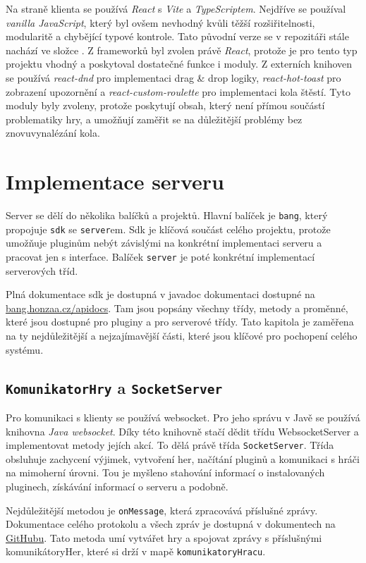 Na straně klienta se používá \emph{React} s \emph{Vite} a \emph{TypeScriptem}. Nejdříve se používal \emph{vanilla JavaScript}, který byl ovšem nevhodný kvůli těžší rozšiřitelnosti, modularitě a chybějící typové kontrole. Tato původní verze se v repozitáři stále nachází ve složce . Z frameworků byl zvolen právě \emph{React}, protože je pro tento typ projektu vhodný a poskytoval dostatečné funkce i moduly. Z externích knihoven se používá \emph{react-dnd} pro implementaci drag \& drop logiky, \emph{react-hot-toast} pro zobrazení upozornění a \emph{react-custom-roulette} pro implementaci kola štěstí. Tyto moduly byly zvoleny, protože poskytují obsah, který není přímou součástí problematiky hry, a umožňují zaměřit se na důležitější problémy bez znovuvynalézání kola.


\section{Implementace serveru}
Server se dělí do několika balíčků a projektů. Hlavní balíček je \texttt{bang}, který propojuje \texttt{sdk} se \texttt{server}em. Sdk je klíčová součást celého projektu, protože umožňuje pluginům nebýt závislými na konkrétní implementaci serveru a pracovat jen s interface. Balíček \texttt{server} je poté konkrétní implementací serverových tříd.

Plná dokumentace sdk je dostupná v javadoc dokumentaci dostupné na \href{https://bang.honzaa.cz/apidocs/}{\url{bang.honzaa.cz/apidocs}}. Tam jsou popsány všechny třídy, metody a proměnné, které jsou dostupné pro pluginy a pro serverové třídy. Tato kapitola je zaměřena na ty nejdůležitější a nejzajímavější části, které jsou klíčové pro pochopení celého systému.



\subsection{\texttt{KomunikatorHry} a \texttt{SocketServer}}
Pro komunikaci s klienty se používá websocket. Pro jeho správu v Javě se používá knihovna \emph{Java websocket}. Díky této knihovně stačí dědit třídu WebsocketServer a implementovat metody jejích akcí. To dělá právě třída \texttt{SocketServer}. Třída obsluhuje zachycení výjimek, vytvoření her, načítání pluginů a komunikaci s hráči na mimoherní úrovni. Tou je myšleno stahování informací o instalovaných pluginech, získávání informací o serveru a podobně.

Nejdůležitější metodou je \texttt{onMessage}, která zpracovává příslušné zprávy. Dokumentace celého protokolu a všech zpráv je dostupná v dokumentech na \href{http://github.com/honzaHlavnicka/Bang/tree/master/docs/protocol}{GitHubu}. Tato metoda umí vytvářet hry a spojovat zprávy s příslušnými komunikátoryHer, které si drží v mapě \texttt{komunikatoryHracu}.

